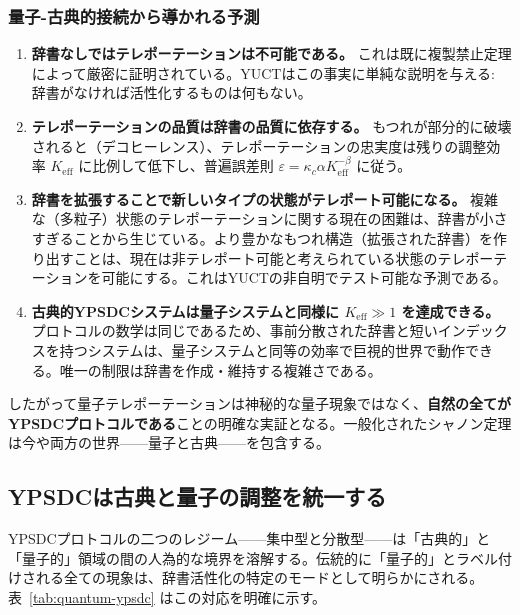 \documentclass[12pt,a4paper]{article}
\theoremstyle{definition}
\theoremstyle{remark}
\begin{document}
	\subsubsection*{量子-古典的接続から導かれる予測}
	
	\begin{enumerate}
		\item \textbf{辞書なしではテレポーテーションは不可能である。} これは既に複製禁止定理によって厳密に証明されている。YUCTはこの事実に単純な説明を与える: 辞書がなければ活性化するものは何もない。
		\item \textbf{テレポーテーションの品質は辞書の品質に依存する。} もつれが部分的に破壊されると（デコヒーレンス）、テレポーテーションの忠実度は残りの調整効率 $K_{\mathrm{eff}}$ に比例して低下し、普遍誤差則 $\varepsilon = \kappa_c \alpha K_{\mathrm{eff}}^{-\beta}$ に従う。
		\item \textbf{辞書を拡張することで新しいタイプの状態がテレポート可能になる。} 複雑な（多粒子）状態のテレポーテーションに関する現在の困難は、辞書が小さすぎることから生じている。より豊かなもつれ構造（拡張された辞書）を作り出すことは、現在は非テレポート可能と考えられている状態のテレポーテーションを可能にする。これはYUCTの非自明でテスト可能な予測である。
		\item \textbf{古典的YPSDCシステムは量子システムと同様に $K_{\mathrm{eff}} \gg 1$ を達成できる。} プロトコルの数学は同じであるため、事前分散された辞書と短いインデックスを持つシステムは、量子システムと同等の効率で巨視的世界で動作できる。唯一の制限は辞書を作成・維持する複雑さである。
	\end{enumerate}
	
	したがって量子テレポーテーションは神秘的な量子現象ではなく、\textbf{自然の全てがYPSDCプロトコルである}ことの明確な実証となる。一般化されたシャノン定理は今や両方の世界——量子と古典——を包含する。
	
	\subsection{YPSDCは古典と量子の調整を統一する}
	\label{subsec:unified-table}
	
	YPSDCプロトコルの二つのレジーム——集中型と分散型——は「古典的」と「量子的」領域の間の人為的な境界を溶解する。伝統的に「量子的」とラベル付けされる全ての現象は、辞書活性化の特定のモードとして明らかにされる。表~\ref{tab:quantum-ypsdc} はこの対応を明確に示す。
	
\end{document}
